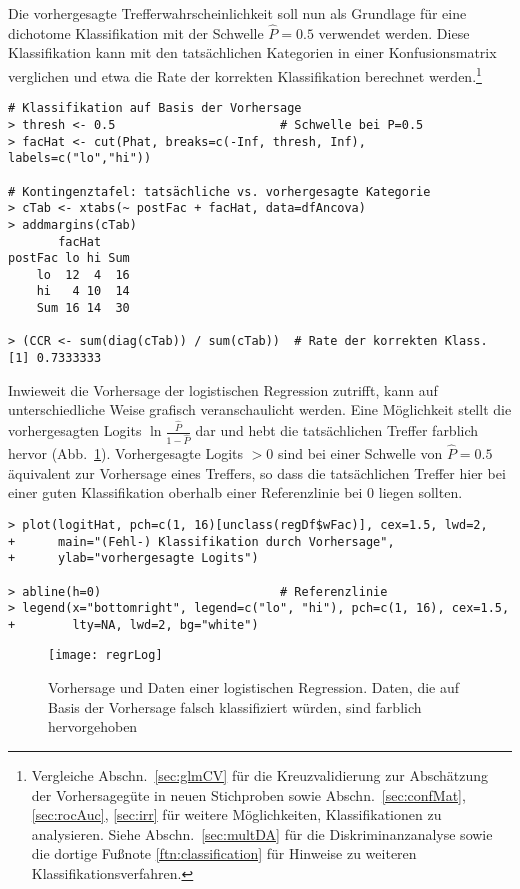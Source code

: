 Die vorhergesagte Trefferwahrscheinlichkeit soll nun als Grundlage für eine dichotome Klassifikation mit der Schwelle $\hat{P}=0.5$ verwendet werden. Diese Klassifikation kann mit den tatsächlichen Kategorien in einer Konfusionsmatrix verglichen und etwa die Rate der korrekten Klassifikation berechnet werden.\footnote{Vergleiche Abschn.\ \ref{sec:glmCV} für die Kreuzvalidierung zur Abschätzung der Vorhersagegüte in neuen Stichproben sowie Abschn.\ \ref{sec:confMat}, \ref{sec:rocAuc}, \ref{sec:irr} für weitere Möglichkeiten, Klassifikationen zu analysieren. Siehe Abschn.\ \ref{sec:multDA} für die Diskriminanzanalyse sowie die dortige Fußnote \ref{ftn:classification} für Hinweise zu weiteren Klassifikationsverfahren.}
\begin{lstlisting}
# Klassifikation auf Basis der Vorhersage
> thresh <- 0.5                       # Schwelle bei P=0.5
> facHat <- cut(Phat, breaks=c(-Inf, thresh, Inf), labels=c("lo","hi"))

# Kontingenztafel: tatsächliche vs. vorhergesagte Kategorie
> cTab <- xtabs(~ postFac + facHat, data=dfAncova)
> addmargins(cTab)
       facHat
postFac lo hi Sum
    lo  12  4  16
    hi   4 10  14
    Sum 16 14  30

> (CCR <- sum(diag(cTab)) / sum(cTab))  # Rate der korrekten Klass.
[1] 0.7333333
\end{lstlisting}

Inwieweit die Vorhersage der logistischen Regression zutrifft, kann auf unterschiedliche Weise grafisch veranschaulicht werden. Eine Möglichkeit stellt die vorhergesagten Logits $\ln \frac{\hat{P}}{1-\hat{P}}$ dar und hebt die tatsächlichen Treffer farblich hervor (Abb.\ \ref{fig:regrLog}). Vorhergesagte Logits $> 0$ sind bei einer Schwelle von $\hat{P}=0.5$ äquivalent zur Vorhersage eines Treffers, so dass die tatsächlichen Treffer hier bei einer guten Klassifikation oberhalb einer Referenzlinie bei $0$ liegen sollten.
\begin{lstlisting}
> plot(logitHat, pch=c(1, 16)[unclass(regDf$wFac)], cex=1.5, lwd=2,
+      main="(Fehl-) Klassifikation durch Vorhersage",
+      ylab="vorhergesagte Logits")

> abline(h=0)                         # Referenzlinie
> legend(x="bottomright", legend=c("lo", "hi"), pch=c(1, 16), cex=1.5,
+        lty=NA, lwd=2, bg="white")
\end{lstlisting}

\begin{figure}[ht]
\centering
\texttt{[image: regrLog]}
\vspace*{-1em}
\caption{Vorhersage und Daten einer logistischen Regression. Daten, die auf Basis der Vorhersage falsch klassifiziert würden, sind farblich hervorgehoben}
\label{fig:regrLog}
\end{figure}

